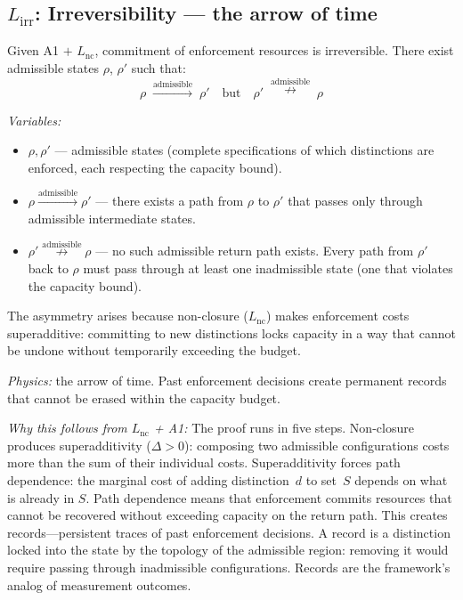 \documentclass[11pt]{article}
\begin{document}
\subsection{\texorpdfstring{$L_{\mathrm{irr}}$}{Lirr}: Irreversibility --- the arrow of time}

\begin{tcolorbox}[apfbox, title={Lemma $L_{\mathrm{irr}}$ (Irreversibility of Enforcement Commitment)}]
Given A1 $+$ $L_{\mathrm{nc}}$, commitment of enforcement resources is irreversible.  There exist admissible states $\rho$, $\rho'$ such that:
\begin{equation}
\rho \;\xrightarrow{\text{admissible}}\; \rho' \quad\text{but}\quad \rho' \;\overset{\text{admissible}}{\nrightarrow}\; \rho
\end{equation}

\smallskip\noindent\textit{Variables:}
\begin{itemize}[nosep,leftmargin=2em]
\item $\rho, \rho'$ --- admissible states (complete specifications of which distinctions are enforced, each respecting the capacity bound).
\item $\rho \xrightarrow{\text{admissible}} \rho'$ --- there exists a path from $\rho$ to $\rho'$ that passes only through admissible intermediate states.
\item $\rho' \overset{\text{admissible}}{\nrightarrow} \rho$ --- no such admissible return path exists.  Every path from $\rho'$ back to $\rho$ must pass through at least one inadmissible state (one that violates the capacity bound).
\end{itemize}

\smallskip\noindent
The asymmetry arises because non-closure ($L_{\mathrm{nc}}$) makes enforcement costs superadditive: committing to new distinctions locks capacity in a way that cannot be undone without temporarily exceeding the budget.
\end{tcolorbox}

\textit{Physics:} the arrow of time.  Past enforcement decisions create permanent records that cannot be erased within the capacity budget.

\textit{Why this follows from $L_{\mathrm{nc}}$ + A1:} The proof runs in five steps.  Non-closure produces superadditivity ($\Delta > 0$): composing two admissible configurations costs more than the sum of their individual costs.  Superadditivity forces path dependence: the marginal cost of adding distinction~$d$ to set~$S$ depends on what is already in $S$.  Path dependence means that enforcement commits resources that cannot be recovered without exceeding capacity on the return path.  This creates records---persistent traces of past enforcement decisions.  A record is a distinction locked into the state by the topology of the admissible region: removing it would require passing through inadmissible configurations.  Records are the framework's analog of measurement outcomes.
\end{document}
